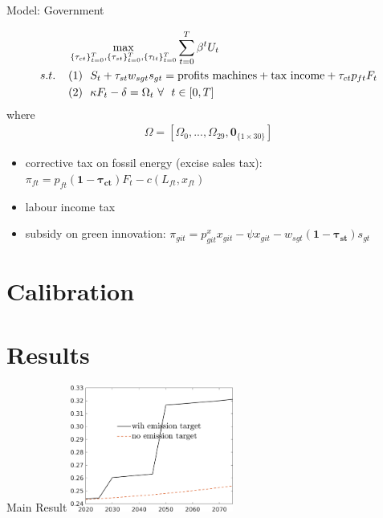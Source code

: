 \documentclass[11pt,aspectratio=169]{beamer}
\begin{document}
\begin{frame}{Model: Government}

\begin{align*}
&\max_{\{\tau_{ct}\}_{t=0}^{T}, \{\tau_{st}\}_{t=0}^{T}, \{\tau_{lt}\}_{t=0}^{T}} \sum_{t=0}^{T}\beta^t U_{t}\\
s.t. \hspace{4mm}
&(1)\ \ S_t+\tau_{st}w_{sgt}s_{gt}= \text{profits machines}+\text{tax income}+\tau_{ct}p_{ft}F_{t}\\
&
(2)\ \ \kappa F_t-\delta =\Omega_t\  \forall\ \  t\in[0,T]
\end{align*}
where 
\begin{align*}
\Omega =\left[\Omega_0,..., \Omega_{29}, \pmb{0}_{\{1\times 30\}}\right]
\end{align*}
	\begin{itemize}
	\item corrective tax on fossil energy (excise sales tax): $\pi_{ft}=p_{ft}\pmb{(1-\tau_{ct})}F_t-c(L_{ft}, x_{ft})$
	\item labour income tax
	\item subsidy on green innovation: $\pi_{git}=p_{git}^x x_{git}-\psi x_{git}-w_{sgt}\pmb{(1-\tau_{st})}s_{gt}$
\end{itemize}
\end{frame}

\section{Calibration}

\section{Results}
\begin{frame}{Main Result}
\includegraphics[width=0.4\textwidth]{../codding_model/own_basedOnFried/optimalPol_elastS_DisuSci/figures/all_1705/taul_TargetCompOPT_T_NoTaus_spillover0_sep1_BN0_ineq1_red0_etaa0.79_lgd1}
\end{frame}
\end{document}

